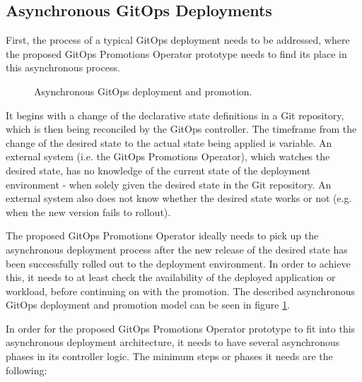 \subsection{Asynchronous GitOps Deployments}
\label{prototype:design:async-gitops-deployments}

First, the process of a typical GitOps deployment needs to be addressed, where
the proposed GitOps Promotions Operator prototype needs to find its place in this asynchronous process.

\begin{figure}[h]
	\centering
	\caption{Asynchronous GitOps deployment and promotion.
	}
	\label{fig:async-gitops-promo-arch}	
\end{figure}

It begins with a change of the declarative state definitions in a Git repository,
which is then being reconciled by the GitOps controller.
The timeframe from the change of the desired state to the actual state being applied
is variable. An external system (i.e. the GitOps Promotions Operator), which watches the desired state, has no knowledge of
the current state of the deployment environment - when solely given the desired state in the
Git repository. An external system also does not know whether the desired state works or not
(e.g. when the new version fails to rollout).

The proposed GitOps Promotions Operator ideally needs to pick up
the asynchronous deployment process after the new release of the desired state
has been successfully rolled out to the deployment environment.
In order to achieve this,
it needs to at least check the availability of the deployed application or workload,
before continuing on with the promotion.
The described asynchronous GitOps deployment and promotion model can be seen in figure
\ref{fig:async-gitops-promo-arch}.

In order for the proposed GitOps Promotions Operator prototype to fit into
this asynchronous deployment architecture,
it needs to have several asynchronous phases in its controller logic.
The minimum steps or phases it needs are the following:

